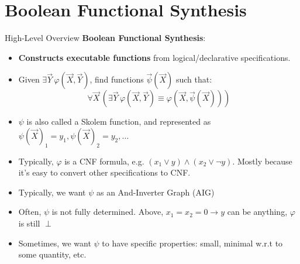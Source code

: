 \documentclass[aspectratio=169]{beamer}
\begin{document}
\section{Boolean Functional Synthesis}
\begin{frame}{High-Level Overview}
  \textbf{Boolean Functional Synthesis}:
  \begin{itemize}
    \item \textbf{Constructs executable functions} from logical/declarative
        specifications.
    \item Given \(\exists \vec{Y}\, \varphi(\vec{X}, \vec{Y})\),
        find functions \(\vec{\psi}(\vec{X})\) such that:
        \[
            \forall \vec{X}\, \left( \exists \vec{Y}\, \varphi(\vec{X}, \vec{Y}) \equiv \varphi(\vec{X}, \vec{\psi}(\vec{X})) \right)
        \]
    \item $\psi$ is also called a Skolem function, and represented as
        $\psi(\vec{X})_1 = y_1, \psi(\vec{X})_2 = y_2, \ldots$
    \item Typically, $\varphi$ is a CNF formula, e.g. $(x_1 \lor y) \land (x_2
        \lor \neg y)$. Mostly because it's easy to convert other specifications
        to CNF.
    \item Typically, we want $\psi$ as an And-Inverter Graph (AIG)
    \item Often, $\psi$ is not fully determined. Above, $x_1 = x_2 = 0
        \rightarrow y$ can be anything, $\varphi$ is still $\perp$
    \item Sometimes, we want $\psi$ to have specific properties: small, minimal
        w.r.t to some quantity, etc.
\end{itemize}
\end{frame}
\end{document}
